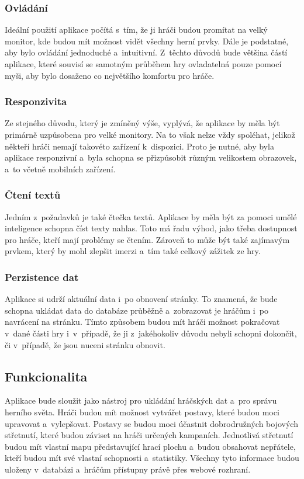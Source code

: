 \subsubsection*{Ovládání}
Ideální použití aplikace počítá s~tím, že ji hráči budou promítat na velký monitor, kde budou mít možnost vidět všechny herní prvky. Dále je podstatné, aby bylo ovládání jednoduché a~intuitivní. Z~těchto důvodů bude většina částí aplikace, které souvisí se samotným průběhem hry ovladatelná pouze pomocí myši, aby bylo dosaženo co největšího komfortu pro hráče.

\subsubsection*{Responzivita}
Ze stejného důvodu, který je zmíněný výše, vyplývá, že aplikace by měla být primárně uzpůsobena pro velké monitory. Na to však nelze vždy spoléhat, jelikož někteří hráči nemají takovéto zařízení k~dispozici. Proto je nutné, aby byla aplikace responzivní a~byla schopna se přizpůsobit různým velikostem obrazovek, a~to včetně mobilních zařízení.

\subsubsection*{Čtení textů}
Jedním z~požadavků je také čtečka textů. Aplikace by měla být za pomoci umělé inteligence schopna číst texty nahlas. Toto má řadu výhod, jako třeba dostupnost pro hráče, kteří mají problémy se čtením. Zároveň to může být také zajímavým prvkem, který by mohl zlepšit imerzi a~tím také celkový zážitek ze hry.

\subsubsection*{Perzistence dat}
Aplikace si udrží aktuální data i~po obnovení stránky. To znamená, že bude schopna ukládat data do databáze průběžně a~zobrazovat je hráčům i~po navrácení na stránku. Tímto způsobem budou mít hráči možnost pokračovat v~dané části hry i~v~případě, že ji z~jakéhokoliv důvodu nebyli schopni dokončit, či v~případě, že jsou nuceni stránku obnovit.

\subsection{Funkcionalita}
Aplikace bude sloužit jako nástroj pro ukládání hráčských dat a~pro správu herního světa. Hráči budou mít možnost vytvářet postavy, které budou moci upravovat a~vylepšovat. Postavy se budou moci účastnit dobrodružných bojových střetnutí, které budou záviset na hráči určených kampaních. Jednotlivá střetnutí budou mít vlastní mapu představující hrací plochu a~budou obsahovat nepřátele, kteří budou mít své vlastní schopnosti a~statistiky. Všechny tyto informace budou uloženy v~databázi a~hráčům přístupny právě přes webové rozhraní.

